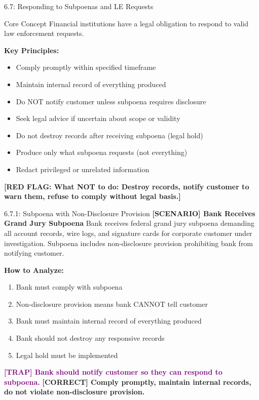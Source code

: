 \documentclass[11pt,a4paper]{beamer}
\newcommand{\trap}[1]{\textcolor{purple}{\textbf{[TRAP] #1}}}
\newcommand{\correct}[1]{\textcolor{green!50!black}{\textbf{[CORRECT] #1}}}
\newcommand{\scenario}[1]{\textcolor{blue!70!black}{\textbf{[SCENARIO] #1}}}
\newcommand{\redflag}[1]{\textcolor{red!80!black}{\textbf{[RED FLAG: #1]}}}
\begin{document}
\begin{frame}{6.7: Responding to Subpoenas and LE Requests}
	\begin{block}{Core Concept}
		Financial institutions have a legal obligation to respond to valid law enforcement requests.
	\end{block}
	\textbf{Key Principles:}
	\begin{itemize}
		\item Comply promptly within specified timeframe
		\item Maintain internal record of everything produced
		\item Do NOT notify customer unless subpoena requires disclosure
		\item Seek legal advice if uncertain about scope or validity
		\item Do not destroy records after receiving subpoena (legal hold)
		\item Produce only what subpoena requests (not everything)
		\item Redact privileged or unrelated information
	\end{itemize}
	\redflag{What NOT to do: Destroy records, notify customer to warn them, refuse to comply without legal basis.}
\end{frame}

\begin{frame}{6.7.1: Subpoena with Non-Disclosure Provision}
	\scenario{Bank Receives Grand Jury Subpoena}
	Bank receives federal grand jury subpoena demanding all account records, wire logs, and signature cards for corporate customer under investigation. Subpoena includes non-disclosure provision prohibiting bank from notifying customer.
	
	\vspace{0.1cm}
	\textbf{How to Analyze:}
	\begin{enumerate}
		\item Bank must comply with subpoena
		\item Non-disclosure provision means bank CANNOT tell customer
		\item Bank must maintain internal record of everything produced
		\item Bank should not destroy any responsive records
		\item Legal hold must be implemented
	\end{enumerate}
	\trap{Bank should notify customer so they can respond to subpoena.}
	\correct{Comply promptly, maintain internal records, do not violate non-disclosure provision.}
\end{frame}
\end{document}
